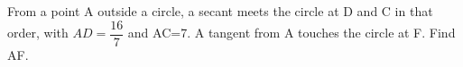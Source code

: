 From a point A outside a circle, a secant meets the circle at D and C in that order, with $AD=\dfrac{16}{7}$ and AC=7. A tangent from A touches the circle at F. Find AF.
